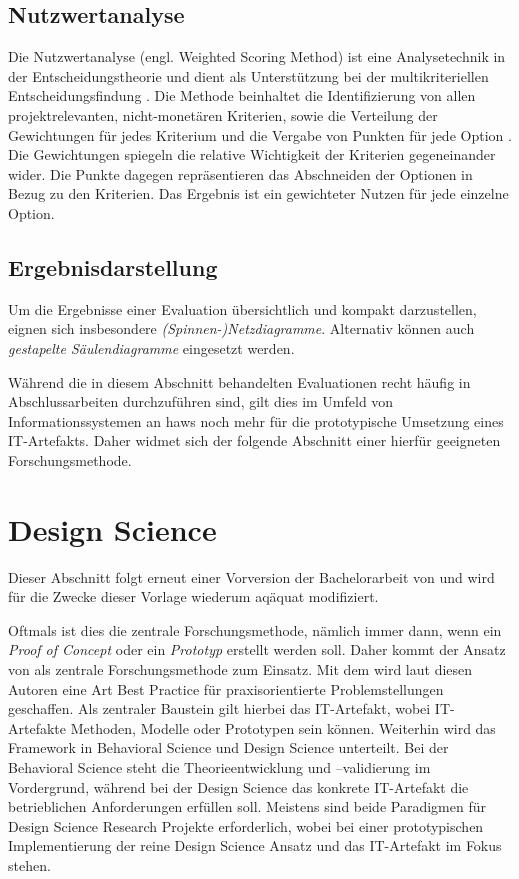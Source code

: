 \subsection{Nutzwertanalyse}
\label{subsec:FM-Eval-Nutzwertanalyse}
Die Nutzwertanalyse (engl. Weighted Scoring Method) ist eine Analysetechnik in der
Entscheidungstheorie und dient als Unterstützung bei der multikriteriellen Entscheidungsfindung \parencite[s.][]{Putzhammer2015}. Die Methode beinhaltet die Identifizierung von allen
projektrelevanten, nicht-monetären Kriterien, sowie die Verteilung der Gewichtungen für
jedes Kriterium und die Vergabe von Punkten für jede Option \parencite[s.][]{Windolph2015}. Die
Gewichtungen spiegeln die relative Wichtigkeit der Kriterien gegeneinander wider. Die Punkte
dagegen repräsentieren das Abschneiden der Optionen in Bezug zu den Kriterien. Das Ergebnis
ist ein gewichteter Nutzen für jede einzelne Option.
%
\subsection{Ergebnisdarstellung}
\label{subsec:FM-Eval-Ergebnisdarstellung}
%
Um die Ergebnisse einer Evaluation übersichtlich und kompakt darzustellen, eignen sich insbesondere
\emph{(Spinnen-)Netzdiagramme}. Alternativ können auch \emph{gestapelte Säulendiagramme} eingesetzt
werden.

Während die in diesem Abschnitt behandelten Evaluationen recht häufig in Abschlussarbeiten durchzuführen
sind, gilt dies im Umfeld von Informationssystemen an \glspl{haw} noch mehr für die prototypische
Umsetzung eines IT-Artefakts. Daher widmet sich der folgende Abschnitt einer hierfür geeigneten
Forschungsmethode.
%
\section{Design Science}
\label{sec:FM-Design_Science}
%
Dieser Abschnitt folgt erneut einer Vorversion der Bachelorarbeit von \textcite{Riedel2018} und
wird für die Zwecke dieser Vorlage wiederum aqäquat modifiziert.
%

Oftmals ist dies die zentrale Forschungsmethode, nämlich immer dann, wenn ein \emph{Proof of Concept} oder ein \emph{Prototyp} erstellt werden soll. Daher kommt der  Ansatz von
\textcite{Hevneretal2004}
als zentrale Forschungsmethode zum Einsatz. Mit dem 
wird laut diesen Autoren eine Art Best Practice für praxisorientierte Problemstellungen geschaffen. 
Als zentraler Baustein gilt hierbei das IT-Artefakt, wobei
IT-Artefakte Methoden, Modelle oder Prototypen sein können. Weiterhin wird das
Framework in Behavioral Science und Design Science unterteilt. Bei der Behavioral
Science steht die Theorieentwicklung und –validierung im Vordergrund, während bei der
Design Science das konkrete IT-Artefakt die betrieblichen Anforderungen erfüllen soll. 
Meistens sind beide Paradigmen für Design Science Research Projekte erforderlich, wobei
bei einer prototypischen Implementierung der reine Design Science Ansatz und das IT-Artefakt 
im Fokus stehen.

